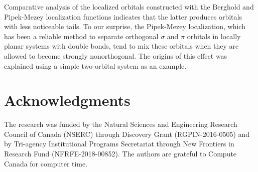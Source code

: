 \documentclass[aps,prl,reprint,amsmath,amssymb]{revtex4-1}
\begin{document}
Comparative analysis of the localized orbitals constructed with the Berghold and Pipek-Mezey localization functions indicates that the latter produces orbitals with less noticeable tails. To our surprise, the Pipek-Mezey localization, which has been a reliable method to separate orthogonal $\sigma$ and $\pi$ orbitals in locally planar systems with double bonds, tend to mix these orbitals when they are allowed to become strongly nonorthogonal. The origins of this effect was explained using a simple two-orbital system as an example.

\section{Acknowledgments} 

The research was funded by the Natural Sciences and Engineering Research Council of Canada (NSERC) through Discovery
Grant (RGPIN-2016-0505) and by Tri-agency Institutional Programs Secretariat through New Frontiers in Research Fund (NFRFE-2018-00852). The authors are grateful to Compute Canada for computer time.



\end{document}
